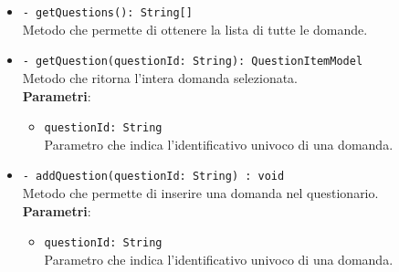 \begin{itemize}
\begin{itemize}
			\item \texttt{- getQuestions(): String[]} \\
			Metodo che permette di ottenere la lista di tutte le domande.
			
			\item \texttt{- getQuestion(questionId: String): QuestionItemModel} \\
			Metodo che ritorna l'intera domanda selezionata. \\
			\textbf{Parametri}:
			\begin{itemize}
				\item \texttt{questionId: String}\\
				Parametro che indica l'identificativo univoco di una domanda.
			\end{itemize}
			\item \texttt{- addQuestion(questionId: String) : void} \\
			Metodo che permette di inserire una domanda nel questionario. \\
			\textbf{Parametri}:
			\begin{itemize}
				\item \texttt{questionId: String}\\
				Parametro che indica l'identificativo univoco di una domanda.
			\end{itemize}
		\end{itemize}
	\end{itemize}
	
	